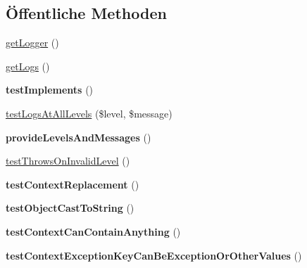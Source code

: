 \subsection*{Öffentliche Methoden}
\begin{DoxyCompactItemize}
\item 
\mbox{\hyperlink{class_psr_1_1_log_1_1_test_1_1_logger_interface_test_a844e56daa065e938e3038d55de09929f}{get\+Logger}} ()
\item 
\mbox{\hyperlink{class_psr_1_1_log_1_1_test_1_1_logger_interface_test_a3223af022509f614758b28d50fba59d7}{get\+Logs}} ()
\item 
\mbox{\label{class_psr_1_1_log_1_1_test_1_1_logger_interface_test_a0dd1110482f887b2c0abb82ffaa5a823}} 
{\bfseries test\+Implements} ()
\item 
\mbox{\hyperlink{class_psr_1_1_log_1_1_test_1_1_logger_interface_test_a7e7d52af21ebd04acfb0c2fd50465714}{test\+Logs\+At\+All\+Levels}} (\$level, \$message)
\item 
\mbox{\label{class_psr_1_1_log_1_1_test_1_1_logger_interface_test_adc0c120d3c4fdad7f30184b1b6784614}} 
{\bfseries provide\+Levels\+And\+Messages} ()
\item 
\mbox{\hyperlink{class_psr_1_1_log_1_1_test_1_1_logger_interface_test_ae175a3645a3ac25e936c04120eb9ac31}{test\+Throws\+On\+Invalid\+Level}} ()
\item 
\mbox{\label{class_psr_1_1_log_1_1_test_1_1_logger_interface_test_ab77c25c78f67b56c65cf8029a458f2eb}} 
{\bfseries test\+Context\+Replacement} ()
\item 
\mbox{\label{class_psr_1_1_log_1_1_test_1_1_logger_interface_test_ae882f83c39288bbc52ead8d8e5cb617b}} 
{\bfseries test\+Object\+Cast\+To\+String} ()
\item 
\mbox{\label{class_psr_1_1_log_1_1_test_1_1_logger_interface_test_a9a39acc45e8b900536e4bcb96532f465}} 
{\bfseries test\+Context\+Can\+Contain\+Anything} ()
\item 
\mbox{\label{class_psr_1_1_log_1_1_test_1_1_logger_interface_test_a153b141c5bfa259e9202982d77b087e5}} 
{\bfseries test\+Context\+Exception\+Key\+Can\+Be\+Exception\+Or\+Other\+Values} ()
\end{DoxyCompactItemize}


